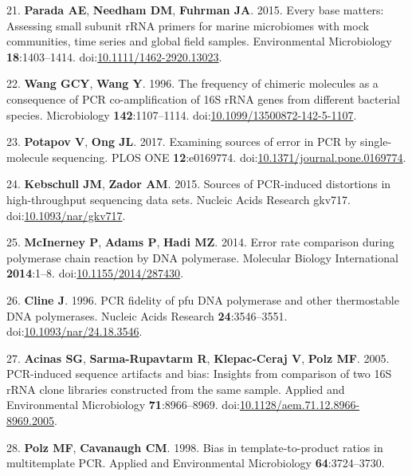 \documentclass[11pt,]{article}
\begin{document}
\hypertarget{ref-Parada2015}{}
21. \textbf{Parada AE}, \textbf{Needham DM}, \textbf{Fuhrman JA}. 2015.
Every base matters: Assessing small subunit rRNA primers for marine
microbiomes with mock communities, time series and global field samples.
Environmental Microbiology \textbf{18}:1403--1414.
doi:\href{https://doi.org/10.1111/1462-2920.13023}{10.1111/1462-2920.13023}.

\hypertarget{ref-Wang1996}{}
22. \textbf{Wang GCY}, \textbf{Wang Y}. 1996. The frequency of chimeric
molecules as a consequence of PCR co-amplification of 16S rRNA genes
from different bacterial species. Microbiology \textbf{142}:1107--1114.
doi:\href{https://doi.org/10.1099/13500872-142-5-1107}{10.1099/13500872-142-5-1107}.

\hypertarget{ref-Potapov2017}{}
23. \textbf{Potapov V}, \textbf{Ong JL}. 2017. Examining sources of
error in PCR by single-molecule sequencing. PLOS ONE
\textbf{12}:e0169774.
doi:\href{https://doi.org/10.1371/journal.pone.0169774}{10.1371/journal.pone.0169774}.

\hypertarget{ref-Kebschull2015}{}
24. \textbf{Kebschull JM}, \textbf{Zador AM}. 2015. Sources of
PCR-induced distortions in high-throughput sequencing data sets. Nucleic
Acids Research gkv717.
doi:\href{https://doi.org/10.1093/nar/gkv717}{10.1093/nar/gkv717}.

\hypertarget{ref-McInerney2014}{}
25. \textbf{McInerney P}, \textbf{Adams P}, \textbf{Hadi MZ}. 2014.
Error rate comparison during polymerase chain reaction by DNA
polymerase. Molecular Biology International \textbf{2014}:1--8.
doi:\href{https://doi.org/10.1155/2014/287430}{10.1155/2014/287430}.

\hypertarget{ref-Cline1996}{}
26. \textbf{Cline J}. 1996. PCR fidelity of pfu DNA polymerase and other
thermostable DNA polymerases. Nucleic Acids Research
\textbf{24}:3546--3551.
doi:\href{https://doi.org/10.1093/nar/24.18.3546}{10.1093/nar/24.18.3546}.

\hypertarget{ref-Acinas2005}{}
27. \textbf{Acinas SG}, \textbf{Sarma-Rupavtarm R}, \textbf{Klepac-Ceraj
V}, \textbf{Polz MF}. 2005. PCR-induced sequence artifacts and bias:
Insights from comparison of two 16S rRNA clone libraries constructed
from the same sample. Applied and Environmental Microbiology
\textbf{71}:8966--8969.
doi:\href{https://doi.org/10.1128/aem.71.12.8966-8969.2005}{10.1128/aem.71.12.8966-8969.2005}.

\hypertarget{ref-Polz1998}{}
28. \textbf{Polz MF}, \textbf{Cavanaugh CM}. 1998. Bias in
template-to-product ratios in multitemplate PCR. Applied and
Environmental Microbiology \textbf{64}:3724--3730.
\end{document}
